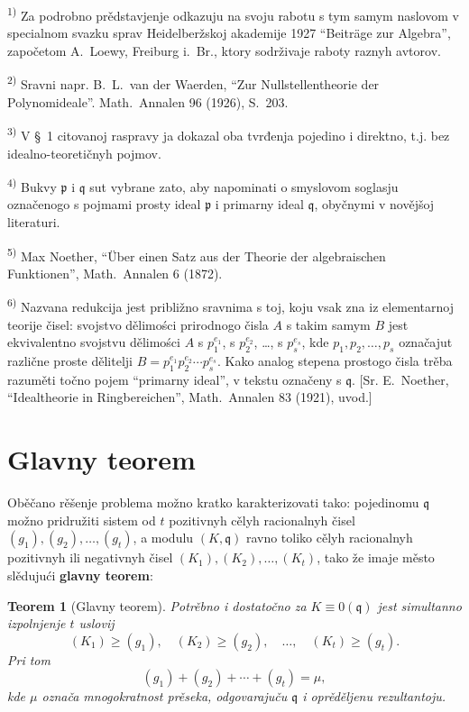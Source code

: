 \documentclass[11pt]{article}
\newcommand{\foreign}[1]{#1}
\theoremstyle{plain}
\newtheorem{satz}{Teorem}
\begin{document}
{\footnotesize
\textsuperscript{1)} Za podrobno prědstavjenje odkazuju na svoju rabotu s tym samym
naslovom v specialnom svazku sprav Heidelberžskoj akademije 1927
``\foreign{Beiträge zur Algebra}'', započetom \foreign{A.\ Loewy}, Freiburg i.\ Br., ktory
sodrživaje raboty raznyh avtorov.

\textsuperscript{2)} Sravni napr. \foreign{B.\ L.\ van der Waerden}, ``\foreign{Zur Nullstellentheorie der Polynomideale}''.
\foreign{Math.\ Annalen} 96 (1926), S.~203.

\textsuperscript{3)} V \S~1 citovanoj raspravy ja dokazal oba tvrđenja pojedino i direktno,
t.j. bez idealno-teoretičnyh pojmov.

\textsuperscript{4)} Bukvy $\mathfrak{p}$ i $\mathfrak{q}$ sut vybrane zato, aby napominati
o smyslovom soglasju označenogo s pojmami prosty ideal
$\mathfrak{p}$ i primarny ideal $\mathfrak{q}$, obyčnymi v novějšoj literaturi.

\textsuperscript{5)} \foreign{Max Noether}, ``\foreign{Über einen Satz aus der Theorie der algebraischen Funktionen}'',
\foreign{Math.\ Annalen} 6 (1872).

\textsuperscript{6)} Nazvana redukcija jest približno sravnima s toj, koju vsak zna iz
elementarnoj teorije čisel: svojstvo dělimości prirodnogo čisla
$A$ s takim samym $B$ jest ekvivalentno svojstvu dělimości $A$ s
$p_{1}^{e_{1}}$, s $p_{2}^{e_{2}}$, \ldots, s $p_{s}^{e_{s}}$, kde
$p_{1}, p_{2}, \ldots, p_{s}$ označajut različne proste dělitelji
$B = p_{1}^{e_{1}}p_{2}^{e_{2}} \cdots p_{s}^{e_{s}}$. Kako analog
stepena prostogo čisla trěba razuměti točno pojem ``primarny ideal'',
v tekstu označeny s $\mathfrak{q}$. [Sr. E.\ Noether,
``\foreign{Idealtheorie in Ringbereichen}'', \foreign{Math.\ Annalen} 83 (1921), uvod.]
}

\newpage
\section*{Glavny teorem}

Oběčano rěšenje problema možno kratko karakterizovati tako:
pojedinomu $\mathfrak{q}$ možno pridružiti sistem od $t$ pozitivnyh
cělyh racionalnyh čisel $(g_{1}), (g_{2}), \ldots, (g_{t})$, a
modulu $(K, \mathfrak{q})$ ravno toliko cělyh racionalnyh pozitivnyh
ili negativnyh čisel $(K_{1}), (K_{2}), \ldots, (K_{t})$, tako že
imaje město slědujući \textbf{glavny teorem}:

\begin{satz}[Glavny teorem]\label{satz:kap-II}
Potrěbno i dostatočno za $K \equiv 0(\mathfrak{q})$ jest
simultanno izpolnjenje $t$ uslovij
\[
(K_{1}) \geq (g_{1}), \quad (K_{2}) \geq (g_{2}), \quad\ldots,\quad (K_{t}) \geq (g_{t}).
\]
Pri tom
\[
(g_{1}) + (g_{2}) + \cdots + (g_{t}) = \mu,
\]
kde $\mu$ označa mnogokratnost prěseka, odgovarajuču
$\mathfrak{q}$ i oprěděljenu rezultantoju.
\end{satz}
\end{document}
